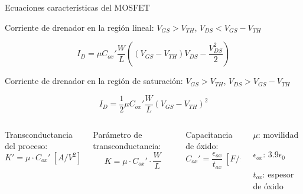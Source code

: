 \documentclass[t,aspectratio=169,10pt]{beamer}
\begin{document}
\begin{frame}{Ecuaciones características del MOSFET}

Corriente de drenador en la región lineal: $V_{GS} > V_{TH}$, $V_{DS} < V_{GS} - V_{TH}$

\begin{tcolorbox}
\[ I_D = \mu C_{ox}' \dfrac{W}{L} \left( (V_{GS} - V_{TH}) V_{DS} - \dfrac{V_{DS}^2}{2} \right) \]
\end{tcolorbox}

Corriente de drenador en la región de saturación: $V_{GS} > V_{TH}$, $ V_{DS} > V_{GS} - V_{TH} $

\begin{tcolorbox}
\[ I_D = \dfrac{1}{2} \mu {}C_{ox}' \dfrac{W}{L} (V_{GS}-V_{TH})^2 \]
\end{tcolorbox}

\begin{columns}
	\begin{column}{0.25\textwidth}
		\centering Transconductancia del proceso:
		\[ K' = \mu\cdot{}C_{ox}'\ [A/V^2] \] 
	\end{column}
	\begin{column}{0.25\textwidth}
		\centering Parámetro de transconductancia:
		\[ K = \mu\cdot{}C_{ox}' \cdot \dfrac{W}{L} \]
	\end{column}
	\begin{column}{0.25\textwidth}
        \centering Capacitancia de óxido:
        \[ C_{ox}' = \dfrac{\epsilon_{ox}}{t_{ox}}\ [F/m^2] \]
	\end{column}
	\begin{column}{0.25\textwidth}		
		$\mu$: movilidad
		
		$\epsilon_{ox}$: 3.9$\epsilon_0$
		
		$t_{ox}$: espesor de óxido
	\end{column}

\end{columns}
\end{frame}
\end{document}
